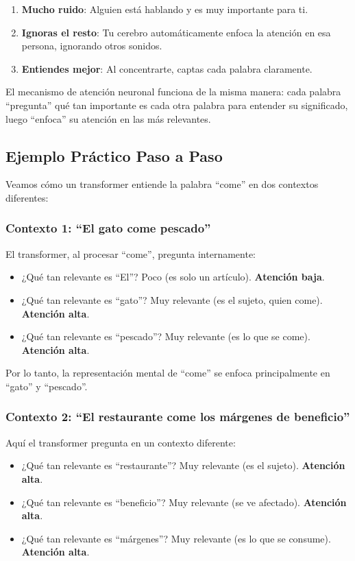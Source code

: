 \documentclass[11pt,a4paper]{article}
\begin{document}
\begin{enumerate}[leftmargin=*]
    \item \textbf{Mucho ruido}: Alguien está hablando y es muy importante para ti.
    \item \textbf{Ignoras el resto}: Tu cerebro automáticamente enfoca la atención en esa persona, ignorando otros sonidos.
    \item \textbf{Entiendes mejor}: Al concentrarte, captas cada palabra claramente.
\end{enumerate}

El mecanismo de atención neuronal funciona de la misma manera: cada palabra ``pregunta'' qué tan importante es cada otra palabra para entender su significado, luego ``enfoca'' su atención en las más relevantes.

\subsection{Ejemplo Práctico Paso a Paso}

Veamos cómo un transformer entiende la palabra ``come'' en dos contextos diferentes:

\subsubsection{Contexto 1: ``El gato come pescado''}

El transformer, al procesar ``come'', pregunta internamente:
\begin{itemize}[leftmargin=*]
    \item ¿Qué tan relevante es ``El''? Poco (es solo un artículo). \textbf{Atención baja}.
    \item ¿Qué tan relevante es ``gato''? Muy relevante (es el sujeto, quien come). \textbf{Atención alta}.
    \item ¿Qué tan relevante es ``pescado''? Muy relevante (es lo que se come). \textbf{Atención alta}.
\end{itemize}

Por lo tanto, la representación mental de ``come'' se enfoca principalmente en ``gato'' y ``pescado''.

\subsubsection{Contexto 2: ``El restaurante come los márgenes de beneficio''}

Aquí el transformer pregunta en un contexto diferente:
\begin{itemize}[leftmargin=*]
    \item ¿Qué tan relevante es ``restaurante''? Muy relevante (es el sujeto). \textbf{Atención alta}.
    \item ¿Qué tan relevante es ``beneficio''? Muy relevante (se ve afectado). \textbf{Atención alta}.
    \item ¿Qué tan relevante es ``márgenes''? Muy relevante (es lo que se consume). \textbf{Atención alta}.
\end{itemize}
\end{document}
